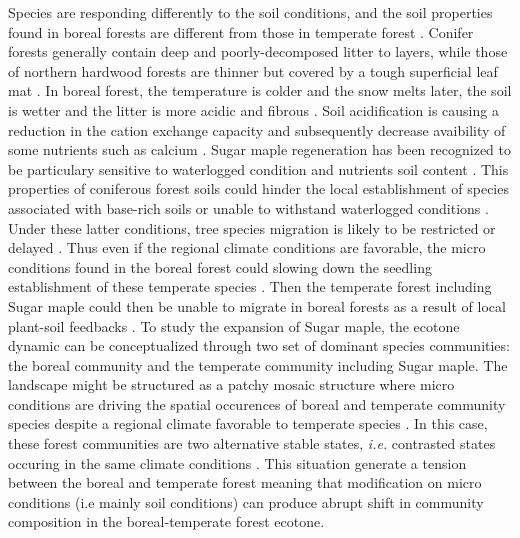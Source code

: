 Species are responding differently to the soil conditions, and the soil
properties found in boreal forests are different from those in temperate
forest \cite{Lafleur2010,Barras1998,Goldblum2010,Demers1998}. Conifer forests
generally contain deep and poorly-decomposed litter to layers, while those of
northern hardwood forests are thinner but covered by a tough superficial leaf
mat \cite{Barras1998}. In boreal forest, the temperature is colder and the
snow melts later, the soil is wetter and the litter is more acidic and fibrous
\cite{Lafleur2010,Goldblum2010}. Soil acidification is causing a reduction in
the cation exchange capacity and subsequently decrease avaibility of some
nutrients such as calcium \cite{Moore2008}. Sugar maple regeneration has been
recognized to be particulary sensitive to waterlogged condition and nutrients
soil content \cite{Moore2008,Lafleur2010,Cleavitt2011}. This properties of
coniferous forest soils could hinder the local establishment of species
associated with base-rich soils or unable to withstand waterlogged conditions
\cite{Lafleur2010}. Under these latter conditions, tree species migration is
likely to be restricted or delayed \cite{Lafleur2010}. Thus even if the
regional climate conditions are favorable, the micro conditions found in the
boreal forest could slowing down the seedling establishment of these temperate
species \cite{Kellman2004,Moore2008,Barras1998,Messier2011}. Then the
temperate forest including Sugar maple could then be unable to migrate in
boreal forests as a result of local plant-soil feedbacks
\cite{McCarthyNeumann2012}. To study the expansion of Sugar maple, the ecotone
dynamic can be conceptualized through two set of dominant species communities:
the boreal community and the temperate community including Sugar maple. The
landscape might be structured as a patchy mosaic structure where micro
conditions are driving the spatial occurences of boreal and temperate
community species despite a regional climate favorable to temperate species
\cite{Goldblum2010,Fisichelli2013}. In this case, these forest communities are
two alternative stable states, \textit{i.e.} contrasted states occuring in the
same climate conditions \cite{scheffer2009critical}. This situation generate a
tension between the boreal and temperate forest meaning that modification on
micro conditions (i.e mainly soil conditions) can produce abrupt shift in
community composition in the boreal-temperate forest ecotone.\\

